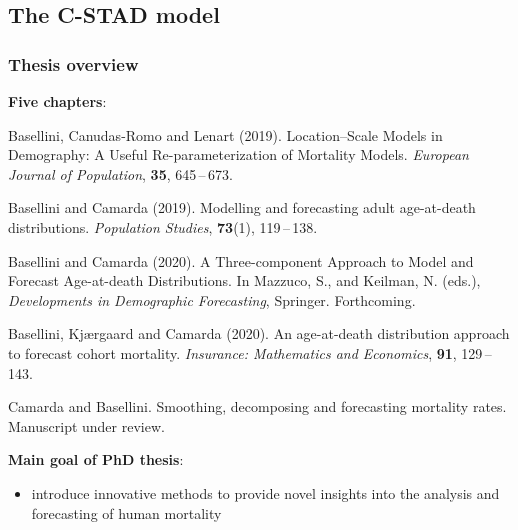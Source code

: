 \documentclass[12pt, xcolor=table]{beamer}  %
\begin{document}
\subsection{The C-STAD model}
\begin{frame}[plain]\frametitle{Thesis overview}
	\textbf{Five chapters}: 
	\begin{itemize}
		\scriptsize	
		\item { Basellini, Canudas-Romo and Lenart (2019). Location--Scale Models in Demography: A Useful Re-parameterization of Mortality Models. {\it European Journal of Population}, {\bf 35}, 645\,--\,673. 	
			
		\item  Basellini and Camarda (2019). Modelling and forecasting adult age-at-death distributions. {\it Population Studies}, {\bf 73}(1), 119\,--\,138. 
		
		\item  Basellini and Camarda (2020). A Three-component Approach to Model and Forecast Age-at-death Distributions. In Mazzuco, S., and Keilman, N. (eds.), {\it Developments in Demographic Forecasting}, Springer. Forthcoming. }
		
		\item { Basellini, Kj{\ae}rgaard and Camarda (2020). An age-at-death distribution approach \\ to forecast cohort mortality. {\it Insurance: Mathematics and Economics}, {\bf 91}, 129\,--\,143. }	
			
		\item { Camarda and Basellini. Smoothing, decomposing and forecasting mortality rates. Manuscript under review. }	
	\end{itemize}
	\bigskip
	{\pgfsetfillopacity{1} 
		\textbf{Main goal of PhD thesis}: 
		\begin{itemize}
			\item introduce innovative methods to provide novel insights into the analysis and forecasting of human mortality	
		\end{itemize}
	}
\end{frame}
\end{document}
